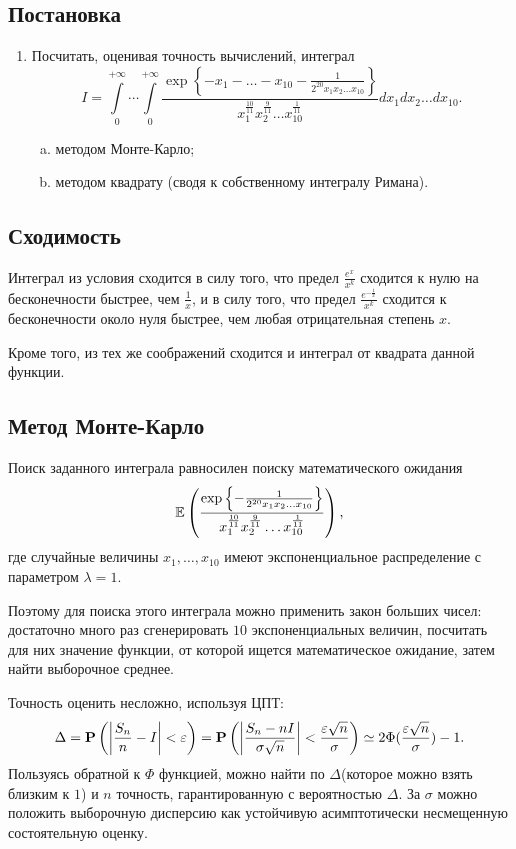 \documentclass[12pt, a4paper]{article}
\begin{document}
\subsection{Постановка}
\begin{enumerate}
\item Посчитать, оценивая точность вычислений, интеграл 
\[ I = \int\limits_{0}^{+\infty}\cdots \int\limits_{0}^{+\infty} 
	\frac {\exp\left\{ -x_1-\dots-x_{10}-\frac{1}{2^{20} x_1 x_2\dots x_{10}} \right\}}
	{x_1^\frac{10}{11}x_2^\frac{9}{11}\dots x_{10}^\frac{1}{11}}
dx_1 dx_2 \dots dx_{10}.	
\]
\begin{enumerate}[(a)]
\item методом Монте-Карло;
\item методом квадрату (сводя к собственному интегралу Римана).
\end{enumerate}
\end{enumerate}

\subsection{Сходимость}
Интеграл из условия сходится в силу того, что предел $\frac {e^x}{x^k}$ сходится к нулю на бесконечности быстрее, чем $\frac 1x$, и в силу того, что предел $\frac{e^{-\frac{1}{x}}}{x^k}$ сходится к бесконечности около нуля быстрее, чем любая отрицательная степень $x$.

Кроме того, из тех же соображений сходится и интеграл от квадрата данной функции.

\subsection{Метод Монте-Карло}
Поиск заданного интеграла равносилен поиску математического ожидания
\[ \E\left( 
\frac {\exp\left\{-\frac{1}{2^{20} x_1 x_2\dots x_{10}} \right\}}
	{x_1^\frac{10}{11}x_2^\frac{9}{11}\dots x_{10}^\frac{1}{11}}
 \right), \]
 где случайные величины $x_1,\dots,x_{10}$ имеют экспоненциальное распределение с параметром $\lambda=1$.

Поэтому для поиска этого интеграла можно применить закон больших чисел: достаточно много раз сгенерировать $10$ экспоненциальных величин, посчитать для них значение функции, от которой ищется математическое ожидание, затем найти выборочное среднее.

Точность оценить несложно, используя ЦПТ:
\[ \Delta = \P\left(\left|\frac{S_n}{n}-I\right|<\varepsilon\right) = 
	\P \left( \left| \frac {S_n - nI}{\sigma \sqrt{n}}\right| < \frac{\varepsilon \sqrt{n}}{\sigma} \right) \simeq 2\Phi(\frac{\varepsilon \sqrt{n}}{\sigma}) - 1.	
\] Пользуясь обратной к $\Phi$ функцией, можно найти по $\Delta$(которое можно взять близким к $1$) и $n$ точность, гарантированную с вероятностью $\Delta$. За $\sigma$ можно положить выборочную дисперсию как устойчивую асимптотически несмещенную состоятельную оценку.
\end{document}

